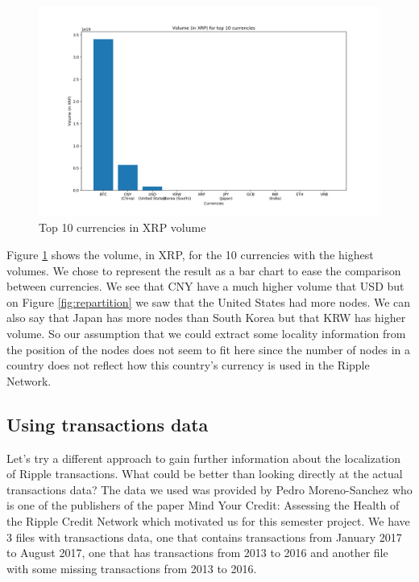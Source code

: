 \begin{figure}[h!]
    \centering
    \includegraphics[width = 0.95\linewidth]{top_10_currencies_in_volume_in_XRP.png}
    \caption{Top 10 currencies in XRP volume}
    \label{fig:volume}
\end{figure}

Figure \ref{fig:volume} shows the volume, in XRP, for the 10 currencies with the highest volumes. We chose to represent the result as a bar chart to ease the comparison between currencies. We see that CNY have a much higher volume that USD but on Figure \ref{fig:repartition} we saw that the United States had more nodes. We can also say that Japan has more nodes than South Korea but that KRW has higher volume. So our assumption that we could extract some locality information from the position of the nodes does not seem to fit here since the number of nodes in a country does not reflect how this country's currency is used in the Ripple Network.

\subsection{Using transactions data}
Let's try a different approach to gain further information about the localization of Ripple transactions. What could be better than looking directly at the actual transactions data? The data we used was provided by Pedro Moreno-Sanchez who is one of the publishers of the paper Mind Your Credit: Assessing the Health of the Ripple Credit Network\cite{MindYourCredit} which motivated us for this semester project. We have 3 files with transactions data, one that contains transactions from January 2017 to August 2017, one that has transactions from 2013 to 2016 and another file with some missing transactions from 2013 to 2016.


